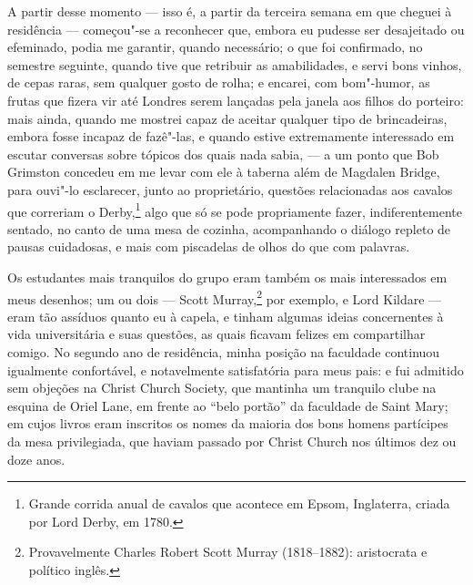 A partir desse momento --- isso é, a partir da terceira semana em
que cheguei à residência --- começou"-se a reconhecer que, embora eu
pudesse ser desajeitado ou efeminado, podia me garantir, quando
necessário; o que foi confirmado, no semestre seguinte, quando tive que
retribuir as amabilidades, e servi bons vinhos, de cepas raras, sem
qualquer gosto de rolha; e encarei, com bom"-humor, as frutas que fizera
vir até Londres serem lançadas pela janela aos filhos do porteiro: mais
ainda, quando me mostrei capaz de aceitar qualquer tipo de brincadeiras,
embora fosse incapaz de fazê"-las, e quando estive extremamente
interessado em escutar conversas sobre tópicos dos quais nada sabia, ---
a um ponto que Bob Grimston concedeu em me levar com ele à taberna além
de Magdalen Bridge, para ouvi"-lo esclarecer, junto ao proprietário,
questões relacionadas aos cavalos que correriam o Derby,\footnote{Grande
  corrida anual de cavalos que acontece em Epsom, Inglaterra, criada por
  Lord Derby, em 1780.} algo que só se pode propriamente
fazer, indiferentemente sentado, no canto de uma mesa de cozinha,
acompanhando o diálogo repleto de pausas cuidadosas, e mais com
piscadelas de olhos do que com palavras.

Os estudantes mais tranquilos do grupo eram também os mais interessados
em meus desenhos; um ou dois --- Scott Murray,\footnote{Provavelmente
  Charles Robert Scott Murray (1818--1882): aristocrata e político inglês.} por exemplo, e Lord Kildare --- eram tão assíduos
quanto eu à capela, e tinham algumas ideias concernentes à vida
universitária e suas questões, as quais ficavam felizes em compartilhar
comigo. No segundo ano de residência, minha posição na faculdade
continuou igualmente confortável, e notavelmente satisfatória para meus
pais: e fui admitido sem objeções na Christ Church Society, que mantinha
um tranquilo clube na esquina de Oriel Lane, em frente ao ``belo
portão'' da faculdade de Saint Mary; em cujos livros eram inscritos os
nomes da maioria dos bons homens partícipes da mesa privilegiada, que
haviam passado por Christ Church nos últimos dez ou doze anos.

